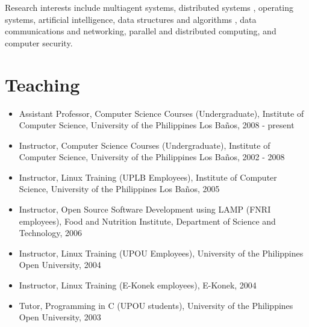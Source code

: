 \documentclass[overlapped,line,letterpaper]{res}
\begin{document}
\begin{resume}
Research interests include multiagent systems, distributed systems
, operating systems, artificial intelligence, data structures and algorithms
, data communications and networking, parallel and distributed computing, and computer security.


\section{\bf Teaching}

\begin{itemize}
\item Assistant Professor, Computer Science Courses (Undergraduate),
Institute of Computer Science, University of the Philippines Los Ba\~{n}os, 2008 - present
\item Instructor, Computer Science Courses (Undergraduate),
Institute of Computer Science, University of the Philippines Los Ba\~{n}os, 2002 - 2008
\item Instructor, Linux Training (UPLB Employees), 
Institute of Computer Science, University of the Philippines Los Ba\~{n}os, 2005
\item Instructor, Open Source Software Development using LAMP (FNRI employees), 
Food and Nutrition Institute, Department of Science and Technology, 2006
\item Instructor, Linux Training (UPOU Employees), 
University of the Philippines Open University, 2004
\item Instructor, Linux Training (E-Konek employees), 
E-Konek, 2004
\item Tutor, Programming in C (UPOU students), 
University of the Philippines Open University, 2003
\end{itemize}


%
%


\end{resume}
\end{document}
